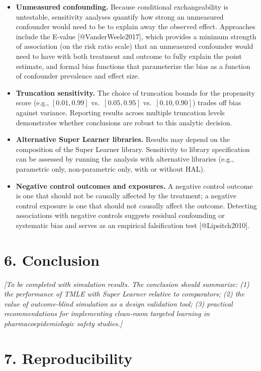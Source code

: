 \documentclass[
  letterpaper,
  DIV=11,
  numbers=noendperiod]{scrartcl}
\begin{document}
\begin{itemize}
\item
  \textbf{Unmeasured confounding.} Because conditional exchangeability
  is untestable, sensitivity analyses quantify how strong an unmeasured
  confounder would need to be to explain away the observed effect.
  Approaches include the E-value {[}@VanderWeele2017{]}, which provides
  a minimum strength of association (on the risk ratio scale) that an
  unmeasured confounder would need to have with both treatment and
  outcome to fully explain the point estimate, and formal bias functions
  that parameterize the bias as a function of confounder prevalence and
  effect size.
\item
  \textbf{Truncation sensitivity.} The choice of truncation bounds for
  the propensity score (e.g., \([0.01, 0.99]\) vs.~\([0.05, 0.95]\)
  vs.~\([0.10, 0.90]\)) trades off bias against variance. Reporting
  results across multiple truncation levels demonstrates whether
  conclusions are robust to this analytic decision.
\item
  \textbf{Alternative Super Learner libraries.} Results may depend on
  the composition of the Super Learner library. Sensitivity to library
  specification can be assessed by running the analysis with alternative
  libraries (e.g., parametric only, non-parametric only, with or without
  HAL).
\item
  \textbf{Negative control outcomes and exposures.} A negative control
  outcome is one that should not be causally affected by the treatment;
  a negative control exposure is one that should not causally affect the
  outcome. Detecting associations with negative controls suggests
  residual confounding or systematic bias and serves as an empirical
  falsification test {[}@Lipsitch2010{]}.
\end{itemize}

\section{6. Conclusion}\label{conclusion}

\emph{{[}To be completed with simulation results. The conclusion should
summarize: (1) the performance of TMLE with Super Learner relative to
comparators; (2) the value of outcome-blind simulation as a design
validation tool; (3) practical recommendations for implementing
clean-room targeted learning in pharmacoepidemiologic safety
studies.{]}}

\section{7. Reproducibility}\label{reproducibility}
\end{document}
